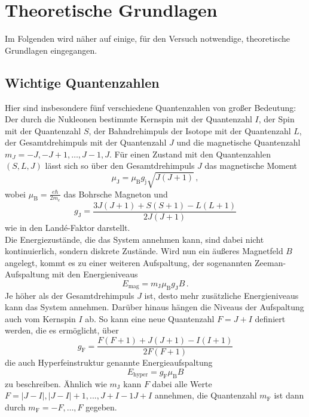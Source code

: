\section{Theoretische Grundlagen}
\label{sec:theorie}

Im Folgenden wird näher auf einige, für den Versuch notwendige, theoretische Grundlagen eingegangen.

\subsection{Wichtige Quantenzahlen}

Hier sind insbesondere fünf verschiedene Quantenzahlen von großer Bedeutung:
Der durch die Nukleonen bestimmte Kernspin mit der Quantenzahl $I$, der Spin mit der Quantenzahl $S$, der Bahndrehimpuls der Isotope mit der Quantenzahl $L$, der Gesamtdrehimpuls mit der Quantenzahl $J$ und die magnetische Quantenzahl $m_J = -J, -J+1, \dots, J-1, J$.
Für einen Zustand mit den Quantenzahlen $(S,L,J)$ lässt sich so über den Gesamtdrehimpuls $J$ das magnetische Moment
\begin{equation}
    \mu_\text{J} = \mu_\text{B} g_\text{j} \sqrt{J (J + 1)} \,,
    \label{eq:magmom}
\end{equation}
wobei $\mu_\text{B} = \frac{e \hbar}{2 m_e}$ das Bohrsche Magneton und
\begin{equation}
    g_\text{J} = \frac{3 J(J + 1) + S(S + 1) - L(L + 1)}{2 J(J + 1)}
    \label{eq:landefak}
\end{equation}
wie in \cite{Pfeiler2017} den Landé-Faktor darstellt. \\

Die Energiezustände, die das System annehmen kann, sind dabei nicht kontinuierlich, sondern diskrete Zustände.
Wird nun ein äußeres Magnetfeld $B$ angelegt, kommt es zu einer weiteren Aufspaltung, der sogenannten Zeeman-Aufspaltung mit den Energieniveaus
\begin{equation}
    E_\text{mag} = m_\text{J} \mu_\text{B} g_\text{J} B \,.
\end{equation}
Je höher als der Gesamtdrehimpuls $J$ ist, desto mehr zusätzliche Energieniveaus kann das System annehmen.
Darüber hinaus hängen die Niveaus der Aufspaltung auch vom Kernspin $I$ ab.
So kann eine neue Quantenzahl $F = J + I$ definiert werden, die es ermöglicht, über
\begin{equation}
    g_\text{F} = \frac{ F(F + 1) + J(J + 1) - I(I + 1)}{2 F(F + 1)}
    \label{eq:FLande}
\end{equation}
die auch Hyperfeinstruktur genannte Energieaufspaltung
\begin{equation}
    E_\text{hyper} = g_\text{F} \mu_\text{B} B
    \label{eq:hyperfein}
\end{equation}
zu beschreiben.
Ähnlich wie $m_\text{J}$ kann $F$ dabei alle Werte $F = |J - I|,|J-I|+1,...,J+I-1 J + I$ annehmen, die Quantenzahl $m_\text{F}$ ist dann durch $m_\text{F} = -F,\dots, F$ gegeben.

